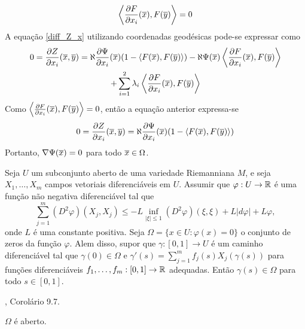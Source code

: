 \begin{demonstracao}
	\begin{equation*}
		\left\langle \frac{\partial F}{\partial x_i}(\overline{x}), F(\overline{y}) \right\rangle = 0
	\end{equation*}	
	A equação \eqref{diff_Z_x} utilizando coordenadas geodésicas pode-se expressar como
	\begin{multline*}
		0 = \frac{\partial Z}{\partial x_i}(\overline{x},\overline{y}) = \aleph \frac{\partial \Psi}{\partial x_i}(\overline{x})(1 - \langle F(\overline{x}),F(\overline{y}) \rangle)  - \aleph \Psi(\overline{x}) \left\langle \frac{\partial F}{\partial x_i}(\overline{x}), F(\overline{y}) \right\rangle\\
		+ \sum_{i=1}^2 \lambda_i \left\langle \frac{\partial F}{\partial x_i}(\overline{x}),F(\overline{y}) \right\rangle
	\end{multline*}	
	Como $\left\langle \frac{\partial F}{\partial x_i}(\overline{x}),F(\overline{y}) \right\rangle = 0$, então a equação anterior expressa-se
	\begin{equation*}
		0 = \frac{\partial Z}{\partial x_i}(\overline{x},\overline{y}) = \aleph \frac{\partial \Psi}{\partial x_i}(\overline{x})(1 - \langle F(\overline{x}),F(\overline{y}) \rangle)
	\end{equation*}	
	Portanto, $\nabla \Psi(\overline{x}) = 0$ para todo $\overline{x} \in \Omega$.
\end{demonstracao}

\begin{lema}\label{bony}
	Seja $U$ um subconjunto aberto de uma variedade Riemanniana $M$, e seja $X_1, \ldots, X_m$ campos vetoriais diferenciáveis em $U$. Assumir que $\varphi: U \rightarrow \mathbb{R}$ é uma função não negativa diferenciável tal que
	\begin{equation*}
		\sum_{j=1}^{m} (D^2 \varphi)(X_j,X_j) \leq -L \inf_{|\xi| \leq 1} (D^2 \varphi)(\xi,\xi) + L |d \varphi| + L \varphi,
	\end{equation*}
	onde $L$ é uma constante positiva. Seja $\Omega = \{ x \in U: \varphi(x) = 0 \}$ o conjunto de zeros da função $\varphi$. Alem disso, supor que $\gamma: [0,1] \rightarrow U$ é um caminho diferenciável tal que $\gamma(0) \in \Omega$ e $\gamma'(s) = \sum_{j=1}^{m} f_j(s) X_j(\gamma(s))$ para funções diferenciáveis $f_1, \ldots, f_m: [0,1] \rightarrow \mathbb{R}$ adequadas. Então $\gamma(s) \in \Omega$ para todo $s \in [0,1]$.
\end{lema}

\begin{demonstracao}
	\cite{Brendle2010}, Corolário 9.7.
\end{demonstracao}

\begin{proposicao}
	$\Omega$ é aberto.
\end{proposicao}

